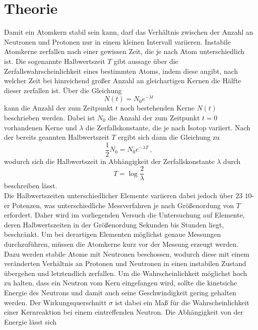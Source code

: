 \section{Theorie}
\label{sec:Theorie}

Damit ein Atomkern stabil sein kann, darf das Verhältnis zwischen der Anzahl an Neutronen und Protonen nur in einem 
kleinen Intervall variieren. Instabile Atomkerne zerfallen nach einer gewissen Zeit, die je nach Atom unterschiedlich ist.
Die sogenannte Halbwertszeit $T$ gibt aussage über die Zerfallswahrscheinlichkeit eines bestimmten Atoms, indem diese angibt,
nach welcher Zeit bei hinreichend großer Anzahl an gleichartigen Kernen die Hälfte dieser zerfallen ist. Über die Gleichung 
\begin{equation}
    N(t) = N_0 e^{-\lambda t}
    \label{eqn:nt}
\end{equation}
kann die Anzahl der zum Zeitpunkt $t$ noch bestehenden Kerne $N(t)$ beschrieben werden. Dabei ist $N_0$ die Anzahl der zum 
Zeitpunkt $t=0$ vorhandenen Kerne und $\lambda$ die Zerfallskonstante, die je nach Isotop variiert. Nach der bereits geannten 
Halbwertszeit $T$ ergibt sich dann die Gleichung zu 
\begin{equation}
    \frac{1}{2}N_0 = N_0 e^{-\lambda T}\,,
\end{equation}
wodurch sich die Halbwertszeit in Abhängigkeit der Zerfallskonstante $\lambda$ durch 
\begin{equation}
    T = \log{\frac{2}{\lambda}}
\end{equation}
beschreiben lässt.
\\
Die Halbwertszeiten unterschiedlicher Elemente variieren dabei jedoch über $23$ $10$-er Potenzen, was unterschiedliche 
Messverfahren je nach Größenordung von $T$ erfordert. Daher wird im vorliegenden Versuch die Untersuchung auf Elemente, deren 
Halbwertszeiten in der Größenordung Sekunden bis Stunden liegt, beschränkt. Um bei derartigen Elementen möglichst genaue Messungen
durchzuführen, müssen die Atomkerne kurz vor der Messung erzeugt werden. Dazu werden stabile Atome mit Neutronen beschossen, 
wodurch diese mit einem veränderten Verhältnis an Protonen und Neutronen in einen instabilen Zustand übergehen und letztendlich
zerfallen. Um die Wahrscheinlichkeit möglichst hoch zu halten, dass ein Neutron vom Kern eingefangen wird, sollte die kinetsiche
Energie des Neutrons und damit auch seine Geschwindigkeit gering gehalten werden. Der Wirkungsquerschnitt $\sigma$ ist dabei ein
Maß für die Wahrscheinlichkeit einer Kernreaktion bei einem eintreffenden Neutron. Die Abhängigkeit von der Energie lässt sich 
